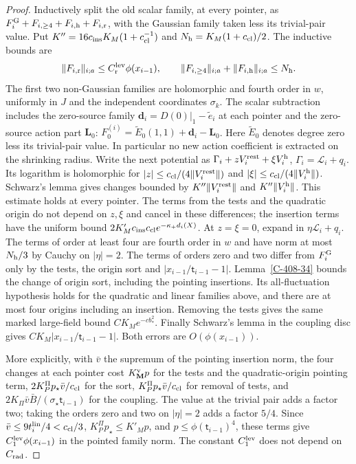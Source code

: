 \documentclass[11pt,letterpaper,reqno]{amsart}
\theoremstyle{definition}
\theoremstyle{remark}
\begin{document}
\begin{proof}
Inductively split the old scalar family, at every pointer, as
$F_i^{\rm G}+F_{i,\ge4}+F_{i,\rm h}+F_{i,\rm r}$, with
the Gaussian family taken less its trivial-pair value.
Put $K''=16c_{\rm ins}K_M(1+c_{\rm cl}^{-1})$ and
$N_{\rm h}=K_M(1+c_{\rm cl})/2$. The inductive bounds are
\[
 \|F_{i,\rm r}\|_{i;a}\le C_{\rm r}^{\rm lev}\phi(x_{i-1}),
 \qquad \|F_{i,\ge4}\|_{i;a}+\|F_{i,\rm h}\|_{i;a}
                                                   \le N_{\rm h}.
\]
The first two non-Gaussian families are holomorphic and fourth
order in $w$, uniformly in $J$ and the independent coordinates
$\sigma_k$. The scalar subtraction includes the zero-source
family $\mathbf d_i=D(0)|_1-\widetilde e_i$ at each pointer
and the zero-source action part $\mathbf L_0$:
$F_0^{(i)}=\widetilde E_0(1,1)+\mathbf d_i-\mathbf L_0$.
Here $\widetilde E_0$ denotes degree zero less its trivial-pair
value. In particular no new action coefficient is extracted
on the shrinking radius.
Write the next potential as
$\Gamma_i+zV_i^{\rm rest}+\xi V_i^{\rm h}$,
$\Gamma_i=\mathcal L_i+q_i$.
Its logarithm is holomorphic for
$|z|\le c_{\rm cl}/(4\|V_i^{\rm rest}\|)$ and
$|\xi|\le c_{\rm cl}/(4\|V_i^{\rm h}\|)$.
Schwarz's lemma gives changes bounded by
$K''\|V_i^{\rm rest}\|$ and $K''\|V_i^{\rm h}\|$.
This estimate holds at every pointer. The terms from the tests
and the quadratic origin do not depend on $z,\xi$ and cancel
in these differences; the insertion terms have the uniform
bound $2K'_Mc_{\rm ins}c_{\rm cl}e^{-\kappa_+d_i(X)}$.
At $z=\xi=0$, expand in $\eta\mathcal L_i+q_i$.
The terms of order at least four are fourth order in $w$ and
have norm at most $N_{\rm h}/3$ by Cauchy on $|\eta|=2$.
The terms of orders zero and two differ from $F_i^{\rm G}$
only by the tests, the origin sort and $|x_{i-1}/\mathsf t_{i-1}-1|$.
Lemma~\ref{C-408-34} bounds the change of origin sort,
including the pointing insertions. Its all-fluctuation
hypothesis holds for the quadratic and linear families above,
and there are at most four origins including an insertion.
Removing the tests gives the same marked large-field bound
$CK_Me^{-cb_*^2}$.
Finally Schwarz's lemma in the coupling disc gives
$C K_M|x_{i-1}/\mathsf t_{i-1}-1|$. Both errors are
$O(\phi(x_{i-1}))$.

More explicitly, with $\bar v$ the supremum of the pointing
insertion norm, the four changes at each pointer cost
$K_{\mathbf M}^{\rm v}p$ for the tests and the quadratic-origin
pointing term, $2K_P^\Pi p_\star\bar v/c_{\rm cl}$ for the
sort, $K_P^\Pi p_\star\bar v/c_{\rm cl}$ for removal of tests,
and $2K_\Pi\bar v\bar B/(\sigma_\star\mathsf t_{i-1})$
for the coupling. The value at the trivial pair adds a factor
two; taking the orders zero and two on $|\eta|=2$ adds a factor
$5/4$. Since $\bar v\le9t_i^{\rm lin}/4<c_{\rm cl}/3$,
$K_P^\Pi p_\star\le K'_Mp$, and
$p\le\phi(\mathsf t_{i-1})^4$, these terms give
$C_1^{\rm lev}\phi(x_{i-1})$ in the pointed family norm.
The constant $C_1^{\rm lev}$ does not depend on $C_{\rm rad}$.


\end{proof}
\end{document}
